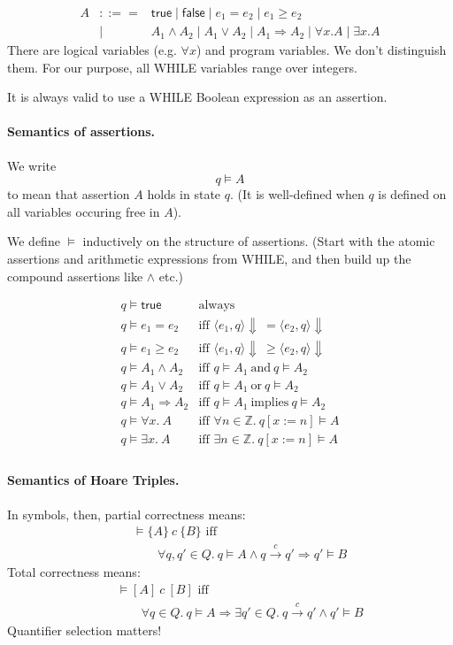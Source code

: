 \documentclass[11pt]{article}
\newcommand{\sem}[3]{\langle #1, #2 \rangle \Downarrow #3}
\begin{document}
\begin{eqnarray*}
  A &::==& \mathsf{true} \mid \mathsf{false} \mid e_1 = e_2 \mid e_1 \geq e_2 \\
  &\mid& A_1 \wedge A_2 \mid A_1 \vee A_2 \mid A_1 \Rightarrow A_2 \mid \forall x. A \mid \exists x. A
\end{eqnarray*}
There are logical variables (e.g. $\forall x$) and program variables.
We don't distinguish them. For our purpose, all WHILE variables range over integers.

It is always valid to use a WHILE Boolean expression as an assertion.

\paragraph{Semantics of assertions.}
We write
\[ q \models A \]
to mean that assertion $A$ holds in state $q$.
(It is well-defined when $q$ is defined on all variables occuring free in $A$).

We define $\models$ inductively on the structure of assertions. (Start with the atomic assertions
and arithmetic expressions from WHILE, and then build up the compound assertions like $\wedge$ etc.)

\[
\begin{array}{ll}
  q \models \mathsf{true} & \mbox{always} \\
  q \models e_1 = e_2 &    \mbox{iff~} \sem{e_1}{q}{}~ = \sem{e_2}{q}{} \\
  q \models e_1 \geq e_2 & \mbox{iff~} \sem{e_1}{q}{}~ \geq \sem{e_2}{q}{} \\
  q \models A_1 \wedge A_2 & \mbox{iff~} q \models A_1 \mathrm{~and~} q \models A_2 \\
  q \models A_1 \vee A_2 & \mbox{iff~} q \models A_1 \mathrm{~or~} q \models A_2 \\
  q \models A_1 \Rightarrow A_2 & \mbox{iff~} q \models A_1 \mathrm{~implies~} q \models A_2 \\
  q \models \forall x.~ A & \mbox{iff~} \forall n \in \mathbb{Z}.~q[x:=n] \models A\\
  q \models \exists x.~ A & \mbox{iff~} \exists n \in \mathbb{Z}.~q[x:=n] \models A\\
\end{array}
\]

\paragraph{Semantics of Hoare Triples.} In symbols, then, partial correctness means:
\begin{eqnarray*} && \models \{ A \} ~c~ \{ B \} \mbox{ iff } \\
  && \qquad \forall q, q' \in Q.~ q \models A \wedge q \xrightarrow{c} q' \Rightarrow q' \models B
\end{eqnarray*}
Total correctness means:
\begin{eqnarray*} && \models [ A ] ~c~ [ B ] \mbox{ iff } \\
  && \qquad \forall q \in Q.~ q \models A \Rightarrow \exists q' \in Q.~ q \xrightarrow{c} q' \wedge q' \models B
\end{eqnarray*}
Quantifier selection matters!
\end{document}
